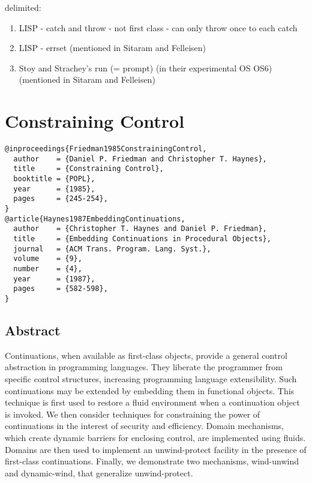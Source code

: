\documentclass[letterpaper]{llncs}
\begin{document}
delimited:
\begin{enumerate}
	\item LISP - catch and throw - not first class - can only throw once to each catch
	\item LISP - errset (mentioned in Sitaram and Felleisen)
	\item Stoy and Strachey's run (= prompt) (in their experimental OS OS6) (mentioned in Sitaram and Felleisen)
\end{enumerate}

\section*{Constraining Control}%

\begin{verbatim}
@inproceedings{Friedman1985ConstrainingControl,
  author    = {Daniel P. Friedman and Christopher T. Haynes},
  title     = {Constraining Control},
  booktitle = {POPL},
  year      = {1985},
  pages     = {245-254},
}
@article{Haynes1987EmbeddingContinuations,
  author    = {Christopher T. Haynes and Daniel P. Friedman},
  title     = {Embedding Continuations in Procedural Objects},
  journal   = {ACM Trans. Program. Lang. Syst.},
  volume    = {9},
  number    = {4},
  year      = {1987},
  pages     = {582-598},
}
\end{verbatim}

\subsection*{Abstract}
Continuations, when available as first-class objects, provide a general control abstraction in programming languages. They liberate the programmer from specific control structures, increasing programming language extensibility. Such continuations may be extended by embedding them in functional objects. This technique is first used to restore a fluid environment when a continuation object is invoked. We then consider techniques for constraining the power of continuations in the interest of security and efficiency. Domain mechanisms, which create dynamic barriers for enclosing control, are implemented using fluids. Domains are then used to implement an unwind-protect facility in the presence of first-class continuations. Finally, we demonstrate two mechanisms, wind-unwind and dynamic-wind, that generalize unwind-protect.
\end{document}
